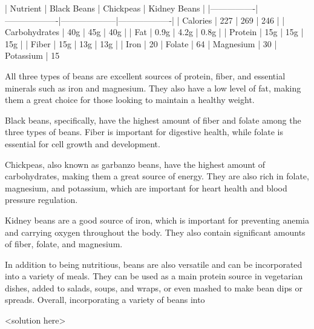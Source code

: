 \question |    Nutrient    |    Black Beans    |     Chickpeas     |    Kidney Beans   |
|----------------|-------------------|--------------------|-------------------|
|     Calories   |       227         |         269        |        246        |
|     Carbohydrates |      40g        |         45g        |        40g        |
|       Fat      |       0.9g        |        4.2g        |        0.8g       |
|      Protein   |       15g         |        15g         |        15g        |
|       Fiber    |       15g         |        13g         |        13g        |
|      Iron      |      20%
|     Folate     |      64%
|    Magnesium   |      30%
|     Potassium  |      15%

All three types of beans are excellent sources of protein, fiber, and essential minerals such as iron and magnesium. They also have a low level of fat, making them a great choice for those looking to maintain a healthy weight. 

Black beans, specifically, have the highest amount of fiber and folate among the three types of beans. Fiber is important for digestive health, while folate is essential for cell growth and development. 

Chickpeas, also known as garbanzo beans, have the highest amount of carbohydrates, making them a great source of energy. They are also rich in folate, magnesium, and potassium, which are important for heart health and blood pressure regulation. 

Kidney beans are a good source of iron, which is important for preventing anemia and carrying oxygen throughout the body. They also contain significant amounts of fiber, folate, and magnesium. 

In addition to being nutritious, beans are also versatile and can be incorporated into a variety of meals. They can be used as a main protein source in vegetarian dishes, added to salads, soups, and wraps, or even mashed to make bean dips or spreads. Overall, incorporating a variety of beans into
\begin{solution}
<solution here>
\end{solution}
